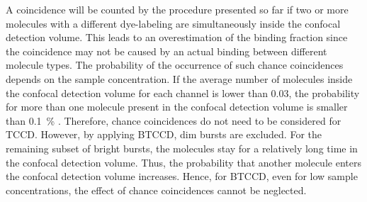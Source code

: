 A coincidence will be counted by the procedure presented so far if two or more molecules with a different dye-labeling are simultaneously inside the confocal detection volume. This leads to an overestimation of the binding fraction since the coincidence may not be caused by an actual binding between different molecule types. The probability of the occurrence of such chance coincidences depends on the sample concentration. If the average number of molecules inside the confocal detection volume for each channel is lower than \num{0.03}, the probability for more than one molecule present in the confocal detection volume is smaller than \SI{0.1}{\percent} \cite{Hoefig2020}. Therefore, chance coincidences do not need to be considered for \gls{TCCD}. However, by applying \gls{BTCCD}, dim bursts are excluded. For the remaining subset of bright bursts, the molecules stay for a relatively long time in the confocal detection volume. Thus, the probability that another molecule enters the confocal detection volume increases. Hence, for \gls{BTCCD}, even for low sample concentrations, the effect of chance coincidences cannot be neglected.\\

